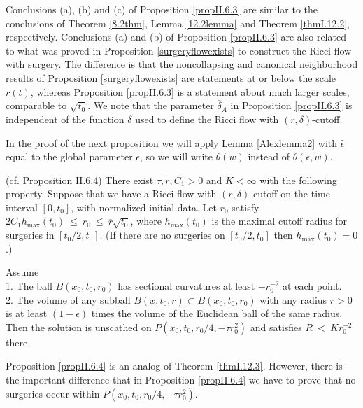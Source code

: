 Conclusions (a), (b) and (c) of Proposition \ref{propII.6.3}
are similar to the conclusions of Theorem \ref{8.2thm},
Lemma \ref{12.2lemma} and Theorem \ref{thmI.12.2}, respectively.
Conclusions (a) and (b) of Proposition \ref{propII.6.3}
are also related
to what was proved in Proposition \ref{surgeryflowexists} to construct the
Ricci flow with surgery. The difference
is that the noncollapsing and canonical neighborhood results of Proposition
\ref{surgeryflowexists}
are statements at or below the scale $r(t)$, whereas Proposition \ref{propII.6.3}
is a statement about much larger scales, comparable to $\sqrt{t_0}$.
We note that the parameter $\overline{\delta}_A$ in
Proposition \ref{propII.6.3} is independent of the function $\delta$
used to define the Ricci flow with $(r, \delta)$-cutoff.


In the proof of the next proposition we will apply Lemma \ref{Alexlemma2} with
$\widehat{\epsilon}$ equal to the global parameter $\epsilon$,
so we will write $\theta(w)$ instead of $\theta(\epsilon, w)$.


\begin{proposition}
  \label{prop:kl-proof-double-sided-curvature-bound-thick-part-modulo-two-propositions-existence-thick-thin-geometry}
 \label{propII.6.4}
(cf. Proposition II.6.4)
There exist $\tau, \overline{r}, C_1 > 0$ and $K < \infty$ with the
following property. Suppose that we have a Ricci flow with $(r, \delta)$-cutoff
on the time interval $[0, t_0]$, with normalized initial data.
  Let $r_0$ satisfy
$2C_1 h_{\max}(t_0) \: \le \: r_0 \: \le \: \overline{r} \sqrt{t_0}$,
where $h_{\max}(t_0)$ is the maximal cutoff radius for surgeries in
$[t_0/2, t_0]$. (If there are no surgeries on $[t_0/2, t_0]$ then
$h_{\max}(t_0) = 0$.)

Assume \\
1. The ball $B(x_0, t_0, r_0)$ has sectional curvatures at least $- r_0^{-2}$
at each point. \\
2. The volume of any subball $B(x, t_0, r) \subset B(x_0, t_0, r_0)$ with
any radius $r > 0$ is at least $(1-\epsilon)$ times the volume of the
Euclidean ball of the same radius.\\

Then the solution is unscathed on
$P(x_0, t_0, r_0/4, - \tau r_0^2)$
and satisfies $R \: < \: K r_0^{-2}$ there.
\end{proposition}

Proposition \ref{propII.6.4} is an analog of Theorem \ref{thmI.12.3}. However,
there is the important difference that in Proposition \ref{propII.6.4}
we have to prove that no surgeries occur within
$P(x_0, t_0, r_0/4, - \tau r_0^2)$.


